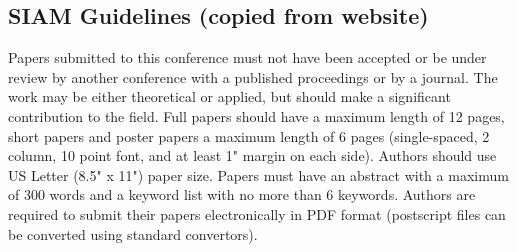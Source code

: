 \documentclass[twoside,leqno,twocolumn]{article}
\begin{document}
\begin{appendix}
\section{SIAM Guidelines (copied from website)}

Papers submitted to this conference must not have been accepted or be under review by another conference with a published proceedings or by a journal.
The work may be either theoretical or applied, but should make a significant contribution to the field.
Full papers should have a maximum length of 12 pages, short papers and poster papers a maximum length of 6 pages (single-spaced, 2 column, 10 point font, and at least 1" margin on each side).
Authors should use US Letter (8.5" x 11") paper size.
Papers must have an abstract with a maximum of 300 words and a keyword list with no more than 6 keywords.
Authors are required to submit their papers electronically in PDF format (postscript files can be converted using standard convertors).

\end{appendix}
\end{document}
